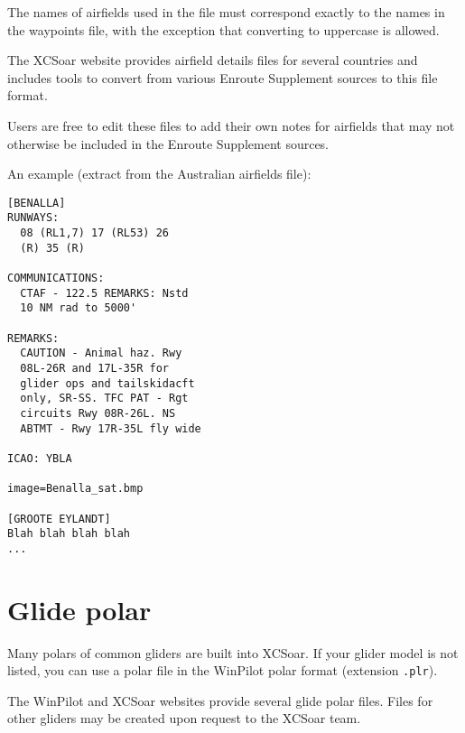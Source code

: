The names of airfields used in the file must correspond exactly to the
names in the waypoints file, with the exception that converting to
uppercase is allowed.

The XCSoar website provides airfield details files for several
countries and includes tools to convert from various Enroute
Supplement sources to this file format.

Users are free to edit these files to add their own notes for
airfields that may not otherwise be included in the Enroute Supplement
sources.

An example (extract from the Australian airfields file):
\begin{verbatim}
[BENALLA]
RUNWAYS:
  08 (RL1,7) 17 (RL53) 26
  (R) 35 (R)

COMMUNICATIONS:
  CTAF - 122.5 REMARKS: Nstd
  10 NM rad to 5000'

REMARKS:
  CAUTION - Animal haz. Rwy
  08L-26R and 17L-35R for
  glider ops and tailskidacft
  only, SR-SS. TFC PAT - Rgt
  circuits Rwy 08R-26L. NS
  ABTMT - Rwy 17R-35L fly wide

ICAO: YBLA

image=Benalla_sat.bmp

[GROOTE EYLANDT]
Blah blah blah blah
...
\end{verbatim}

\section{Glide polar} \label{sec:glide-polar}

Many polars of common gliders are built into XCSoar.  If your glider
model is not listed, you can use a polar file in the WinPilot polar
format (extension \verb|.plr|).

The WinPilot and XCSoar websites provide several glide polar files.
Files for other gliders may be created upon request to the XCSoar
team.

